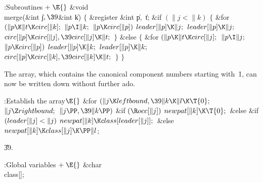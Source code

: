 \B{}:Subroutines\X${}\mathrel+\E{}$\6
\&{void} \\{merge}(\&{int} \|j${},\39{}$\&{int} \|k)\1\1\2\2\6
${}\{{}$\1\6
\&{register} \&{int} \|p${},{}$ \|t;\7
\&{if} ${}(\|j<\|k){}$\5
${}\{{}$\1\6
\&{for} ${}(\|p\K\|t\K\\{circ}[\|k];{}$ ${}\|p\I\|k;{}$ ${}\|p\K\\{circ}[%
\|p]){}$\1\5
${}\\{leader}[\|p]\K\|j;{}$\2\6
${}\\{leader}[\|p]\K\|j;{}$\6
${}\\{circ}[\|p]\K\\{circ}[\|j],\39\\{circ}[\|j]\K\|t;{}$\6
\4${}\}{}$\5
\2\&{else}\5
${}\{{}$\1\6
\&{for} ${}(\|p\K\|t\K\\{circ}[\|j];{}$ ${}\|p\I\|j;{}$ ${}\|p\K\\{circ}[%
\|p]){}$\1\5
${}\\{leader}[\|p]\K\|k;{}$\2\6
${}\\{leader}[\|p]\K\|k;{}$\6
${}\\{circ}[\|p]\K\\{circ}[\|k],\39\\{circ}[\|k]\K\|t;{}$\6
\4${}\}{}$\2\6
\4${}\}{}$\2\par
\fi

The  array, which contains the canonical component
numbers starting with~\.1, can now be written down without further ado.

\Y\B\4:Establish the  array\X${}\E{}$\6
\&{for} ${}(\|j\K\\{leftbound},\39\|k\K\|l\K\T{0};{}$ ${}\|j\Z%
\\{rightbound};{}$ ${}\|j\PP,\39\|k\PP){}$\1\6
\&{if} ${}(\R\\{occ}[\|j]){}$\1\5
${}\\{newpat}[\|k]\K\T{0};{}$\2\6
\&{else} \&{if} ${}(\\{leader}[\|j]<\|j){}$\1\5
${}\\{newpat}[\|k]\K\\{class}[\\{leader}[\|j]];{}$\2\6
\&{else}\1\5
${}\\{newpat}[\|k]\K\\{class}[\|j]\K\PP\|l{}$;\2\2\par
\U39.\fi

\B{}:Global variables\X${}\mathrel+\E{}$\6
\&{char} \\{class}[];\par
\fi

